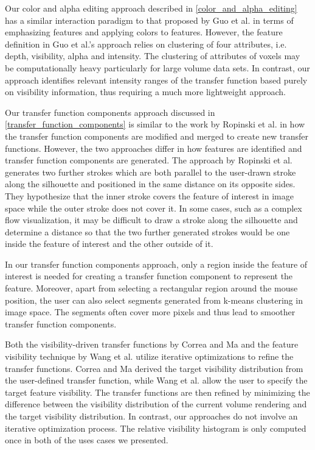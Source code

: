 \documentclass[twoside,twocolumn,10pt]{article}
\begin{document}

Our color and alpha editing approach described in \autoref{color_and_alpha_editing} has a similar interaction paradigm to that proposed by Guo et al. \cite{guo_wysiwyg_2011} in terms of emphasizing features and applying colors to features. However, the feature definition in Guo et al.'s approach relies on clustering of four attributes, i.e. depth, visibility, alpha and intensity. The clustering of attributes of voxels may be computationally heavy particularly for large volume data sets.
In contrast, our approach identifies relevant intensity ranges of the transfer function based purely on visibility information, thus requiring a much more lightweight approach.

Our transfer function components approach discussed in \autoref{transfer_function_components} is similar to the work by Ropinski et al. \cite{ropinski_stroke-based_2008} in how the transfer function components are modified and merged to create new transfer functions.
However, the two approaches differ in how features are identified and transfer function components are generated.
The approach by Ropinski et al. generates two further strokes which are both parallel to the user-drawn stroke along the silhouette and positioned in the same distance on its opposite sides. 
They hypothesize that the inner stroke covers the feature of interest in image space while the outer stroke does not cover it.
In some cases, such as a complex flow visualization, it may be difficult to draw a stroke along the silhouette and determine a distance so that the two further generated strokes would be one inside the feature of interest and the other outside of it.

In our transfer function components approach, only a region inside the feature of interest is needed for creating a transfer function component to represent the feature. Moreover, apart from selecting a rectangular region around the mouse position, the user can also select segments generated from k-means clustering in image space. The segments often cover more pixels and thus lead to smoother transfer function components.

Both the visibility-driven transfer functions by Correa and Ma \cite{correa_visibility_2011} and the feature visibility technique by Wang et al. \cite{wang_efficient_2011} utilize iterative optimizations to refine the transfer functions. Correa and Ma derived the target visibility distribution from the user-defined transfer function, while Wang et al. allow the user to specify the target feature visibility. The transfer functions are then refined by minimizing the difference between the visibility distribution of the current volume rendering and the target visibility distribution. In contrast, our approaches do not involve an iterative optimization process. The relative visibility histogram is only computed once in both of the uses cases we presented.
\end{document}
